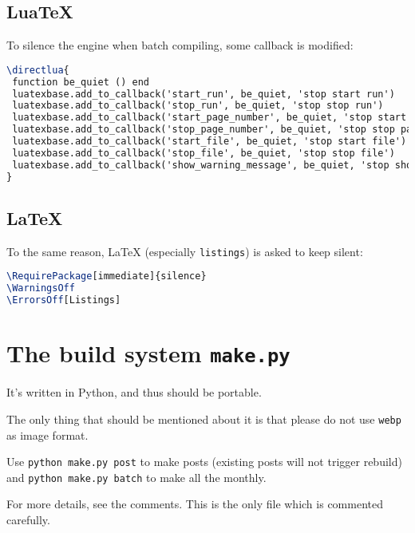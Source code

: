 \section{LuaTeX}
To silence the engine when batch compiling, some callback is modified:\par
\begin{lstlisting}[language=TeX]
\directlua{
 function be_quiet () end
 luatexbase.add_to_callback('start_run', be_quiet, 'stop start run')
 luatexbase.add_to_callback('stop_run', be_quiet, 'stop stop run')
 luatexbase.add_to_callback('start_page_number', be_quiet, 'stop start page')
 luatexbase.add_to_callback('stop_page_number', be_quiet, 'stop stop page')
 luatexbase.add_to_callback('start_file', be_quiet, 'stop start file')
 luatexbase.add_to_callback('stop_file', be_quiet, 'stop stop file')
 luatexbase.add_to_callback('show_warning_message', be_quiet, 'stop show warning message')
}
\end{lstlisting}
\section{LaTeX}
To the same reason, LaTeX (especially \verb!listings!) is asked to keep silent:\par
\begin{lstlisting}[language=TeX]
\RequirePackage[immediate]{silence}
\WarningsOff
\ErrorsOff[Listings]
\end{lstlisting}
\chapter{The build system \texttt{make.py}}
It's written in Python, and thus should be portable.\par
The only thing that should be mentioned about it is that please do not use \verb!webp! as image format.\par
Use \verb!python make.py post! to make posts (existing posts will not trigger rebuild) and \verb!python make.py batch! to make all the monthly.\par
For more details, see the comments. This is the only file which is commented carefully.\par
